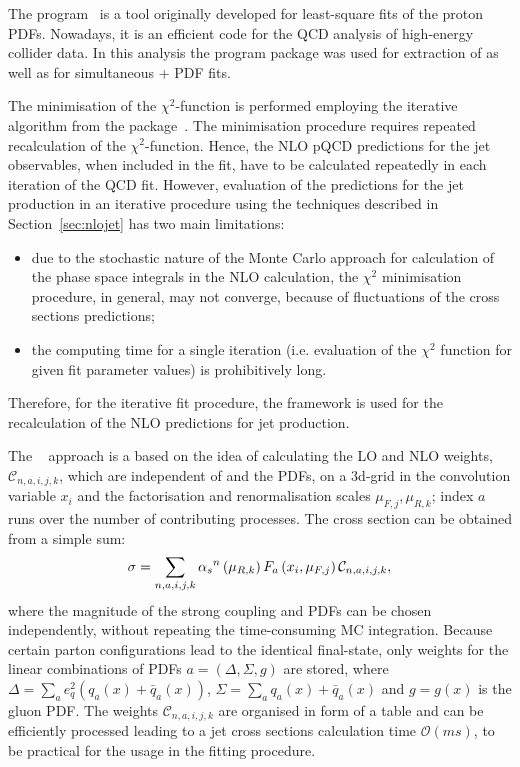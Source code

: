 The \herafitter program~\cite{Aaron:2009aa,Aaron:2009kv} is a tool originally developed for least-square fits of the proton PDFs. Nowadays, it is an efficient code for the QCD analysis of high-energy collider data. In this analysis the \herafitter program package was used for extraction of \as as well as for simultaneous \as+ PDF fits.

The minimisation of the $\chi^2$-function is performed employing the iterative \migrad algorithm from the \minuit package~\cite{James:1975dr}. The minimisation procedure requires repeated recalculation of the $\chi^2$-function. Hence, the NLO pQCD predictions for the jet observables, when included in the fit, have to be calculated repeatedly in each iteration of the QCD fit. However, evaluation of the predictions for the jet production in an iterative procedure using the techniques described in Section~\ref{sec:nlojet} has two main limitations: 
\begin{itemize}
 \item due to the stochastic nature of the Monte Carlo approach for calculation of the phase space integrals in the NLO calculation, the $\chi^2$ minimisation procedure, in general, may not converge, because of fluctuations of the cross sections predictions;
 \item the computing time for a single iteration (i.e. evaluation of the $\chi^2$ function for given fit parameter values) is prohibitively long.
\end{itemize}
Therefore, for the iterative fit procedure, the \fastnlo framework is used for the recalculation of the NLO predictions for jet production. 

The \fastnlo~\cite{thesis:wobisch:2001,Kluge:2006,Wobisch:2011,Britzger:2012} approach is a based on the idea of calculating the LO and NLO weights, $\mathcal{C}_{n,a,i,j,k}$, which are independent of \as and the PDFs, on a 3d-grid in the convolution variable $x_i$ and the factorisation and renormalisation scales $\mu_{F,j}, \mu_{R,k}$; index $a$ runs over the number of contributing processes. The cross section can be obtained from a simple sum:
\begin{equation}
\sigma = \sum_{n,a,i,j,k}{ \mbox{$\alpha_{s}$}^n\left( \mu_{R,k} \right) F_a\left( x_i, \mu_{F,j}\right)\mathcal{C}_{n,a,i,j,k} },
\end{equation}
where the magnitude of the strong coupling and PDFs can be chosen independently, without repeating the time-consuming MC integration. Because certain parton configurations lead to the identical final-state, only weights for the linear combinations of PDFs $a=\left( \Delta, \Sigma, g\right) $ are stored, where $\Delta=\sum_a{e_q^2\left(q_a\left(x\right)+\bar{q}_a\left(x\right)\right)}$, $\Sigma=\sum_a{q_a\left(x\right)+\bar{q}_a\left(x\right)}$ and $g=g\left(x\right)$ is the gluon PDF. The weights $\mathcal{C}_{n,a,i,j,k}$ are organised in form of a table and can be efficiently processed leading to a jet cross sections calculation time $\mathcal{O}\left( ms\right)$, to be practical for the usage in the fitting procedure.


